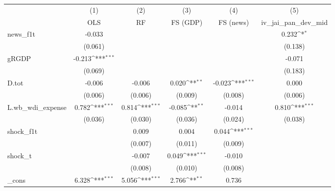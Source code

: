 {
\def\sym#1{\ifmmode^{#1}\else\(^{#1}\)\fi}
\begin{tabular}{l*{5}{c}}
\toprule
            &\multicolumn{1}{c}{(1)}&\multicolumn{1}{c}{(2)}&\multicolumn{1}{c}{(3)}&\multicolumn{1}{c}{(4)}&\multicolumn{1}{c}{(5)}\\
            &\multicolumn{1}{c}{OLS}&\multicolumn{1}{c}{RF}&\multicolumn{1}{c}{FS (GDP)}&\multicolumn{1}{c}{FS (news)}&\multicolumn{1}{c}{iv\_jai\_pan\_dev\_mid}\\
\midrule
news\_f1t    &      -0.033         &                     &                     &                     &       0.232\sym{*}  \\
            &     (0.061)         &                     &                     &                     &     (0.138)         \\
\addlinespace
gRGDP       &      -0.213\sym{***}&                     &                     &                     &      -0.071         \\
            &     (0.069)         &                     &                     &                     &     (0.183)         \\
\addlinespace
D.tot       &      -0.006         &      -0.006         &       0.020\sym{**} &      -0.023\sym{***}&       0.000         \\
            &     (0.006)         &     (0.006)         &     (0.009)         &     (0.008)         &     (0.006)         \\
\addlinespace
L.wb\_wdi\_expense&       0.782\sym{***}&       0.814\sym{***}&      -0.085\sym{**} &      -0.014         &       0.810\sym{***}\\
            &     (0.036)         &     (0.030)         &     (0.036)         &     (0.024)         &     (0.038)         \\
\addlinespace
shock\_f1t   &                     &       0.009         &       0.004         &       0.044\sym{***}&                     \\
            &                     &     (0.007)         &     (0.011)         &     (0.009)         &                     \\
\addlinespace
shock\_t     &                     &      -0.007         &       0.049\sym{***}&      -0.010         &                     \\
            &                     &     (0.008)         &     (0.010)         &     (0.008)         &                     \\
\addlinespace
\_cons      &       6.328\sym{***}&       5.056\sym{***}&       2.766\sym{**} &       0.736         &                     \\

\end{tabular}}
